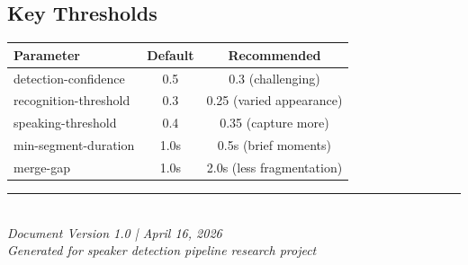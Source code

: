 \documentclass[11pt,a4paper]{article}
\begin{document}
\subsection*{Key Thresholds}

\begin{table}[h]
\centering
\small
\begin{tabular}{@{}lcc@{}}
\toprule
\textbf{Parameter} & \textbf{Default} & \textbf{Recommended} \\
\midrule
detection-confidence & 0.5 & 0.3 (challenging) \\
recognition-threshold & 0.3 & 0.25 (varied appearance) \\
speaking-threshold & 0.4 & 0.35 (capture more) \\
min-segment-duration & 1.0s & 0.5s (brief moments) \\
merge-gap & 1.0s & 2.0s (less fragmentation) \\
\bottomrule
\end{tabular}
\end{table}

\vspace{1cm}
\noindent\rule{\textwidth}{0.4pt}\\
\textit{Document Version 1.0 | April 16, 2026}\\
\textit{Generated for speaker detection pipeline research project}
\end{document}
